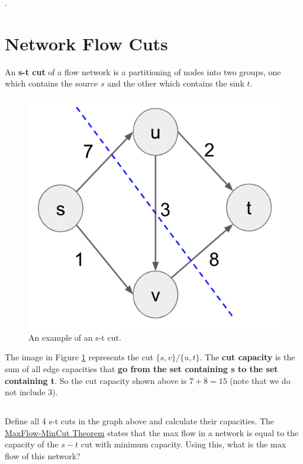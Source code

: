 \documentclass [12pt]{article}
\begin{document}
.


\pagebreak
\section{Network Flow Cuts }

An \textbf{s-t cut} of a flow network is a partitioning of nodes into two groups, one which contains the source $s$ and the other which contains the sink $t$. 

\begin{figure}[h!]
\centering
\includegraphics[scale=0.5]{cut-example.png}
\caption{An example of an s-t cut.}
\label{fig:cut_example}
\end{figure}


The image in Figure \ref{fig:cut_example} represents the cut $\{s, v\} / \{u, t\}$. The \textbf{cut capacity} is the sum of all edge capacities that \textbf{go from the set containing s to the set containing t}. So the cut capacity shown above is $7 + 8 = 15$ (note that we do not include $3$).

\subsection{}

Define all 4 s-t cuts in the graph above and calculate their capacities. The \href{https://en.wikipedia.org/wiki/Max-flow_min-cut_theorem}{MaxFlow-MinCut Theorem} states that the max flow in a network is equal to the capacity of the $s-t$ cut with minimum capacity. Using this, what is the max flow of this network?
\end{document}
